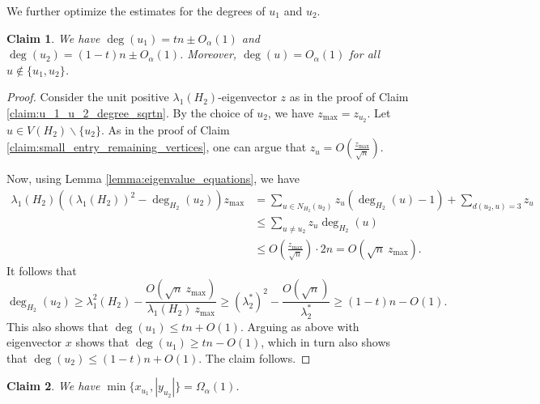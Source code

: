 \documentclass[11pt]{article}
\theoremstyle{plain}
\newtheorem{claim}{Claim}[section]
\numberwithin{equation}{section}
\begin{document}
We further optimize the estimates for the degrees of $u_1$ and $u_2$.

\begin{claim}\label{claim:u_1_u_2_degree_constant}
   We have $\deg(u_1) = tn \pm O_\alpha(1)$ and $\deg(u_2) = (1-t)n \pm O_\alpha(1)$. Moreover, $\deg(u)=O_\alpha(1)$ for all $u\notin \{u_1, u_2\}$.
\end{claim}

\begin{proof}
Consider the unit positive $\lambda_1(H_2)$-eigenvector $z$ as in the proof of Claim \ref{claim:u_1_u_2_degree_sqrtn}. By the choice of $u_2$, we have $z_{\max} = z_{u_2}$. Let $u \in V(H_2)\backslash \{u_2\}$. As in the proof of Claim \ref{claim:small_entry_remaining_vertices}, one can argue that $z_u = O\left(\frac{z_{\max}}{\sqrt{n}}\right)$. 

Now, using Lemma \ref{lemma:eigenvalue_equations}, we have 
\begin{align*}
    \lambda_1(H_2)\left((\lambda_1(H_2))^2 - \deg_{H_2}(u_2)\right)z_{\max} & = \sum_{u\in N_{H_2}(u_2)}z_u (\deg_{H_2}(u)-1) + \sum_{d(u_2,u) = 3}z_u \\
    & \le \sum_{u \neq u_2} z_u \deg_{H_2}(u)\\
    & \le O\left(\frac{z_{\max}}{\sqrt{n}}\right)\cdot 2n = O(\sqrt{n}\ z_{\max}).
\end{align*}
It follows that
\[ \deg_{H_2}(u_2)  \ge \lambda_1^2(H_2) - \frac{O(\sqrt{n}\ z_{\max})}{\lambda_1(H_2)\ z_{\max}}\ge (\lambda_2^*)^2 - \frac{O(\sqrt{n})}{\lambda_2^*}\ge (1-t)n - O(1).\]
This also shows that $\deg(u_1)\le tn + O(1)$. Arguing as above with eigenvector $x$ shows that $\deg(u_1) \ge tn - O(1)$, which in turn also shows that $\deg(u_2) \le (1-t)n + O(1)$. The claim follows.
\end{proof}

\begin{claim}\label{claim:x_max_entry} We have $\min\{x_{u_1}, |y_{u_2}|\} = \Omega_\alpha(1)$.    
\end{claim}
\end{document}

